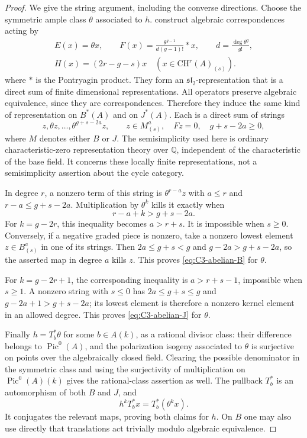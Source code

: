 \begin{proof}
We give the string argument, including the converse directions.
Choose the symmetric ample class $\theta$ associated to $h$.
\citet[Theorem 4.2 and Proposition 5.2, pp.~260--261]{rootBeauville2010}
construct algebraic correspondences acting by
\[
 \begin{gathered}
 E(x)=\theta x,\qquad
 F(x)=\frac{\theta^{g-1}}{d(g-1)!}*x,\qquad
 d=\frac{\deg\theta^g}{g!},\\
 H(x)=(2r-g-s)x\quad(x\in\mathrm{CH}^r(A)_{(s)}).
 \end{gathered}
\]
where $*$ is the Pontryagin product. They form an
$\mathfrak{sl}_2$-representation that is a direct sum of finite
dimensional representations. All operators preserve algebraic
equivalence, since they are correspondences. Therefore they induce
the same kind of representation on $B^*(A)$ and on $J^*(A)$.
Each is a direct sum of strings
\[
        z,\theta z,\ldots,\theta^{g+s-2a}z,
 \qquad z\in M^a_{(s)},\quad Fz=0,\quad g+s-2a\ge0,
\]
where $M$ denotes either $B$ or $J$. The semisimplicity used here
is ordinary characteristic-zero representation theory over
$\mathbb Q$, independent of the characteristic of the base field.
It concerns these locally finite representations, not a
semisimplicity assertion about the cycle category.

In degree $r$, a nonzero term of this string is
$\theta^{r-a}z$ with $a\le r$ and $r-a\le g+s-2a$.
Multiplication by $\theta^k$ kills it exactly when
\[
                         r-a+k>g+s-2a.
\]
For $k=g-2r$, this inequality becomes $a>r+s$.
It is impossible when $s\ge0$. Conversely, if a negative
graded piece is nonzero, take a nonzero lowest element
$z\in B^a_{(s)}$ in one of its strings. Then
$2a\le g+s<g$ and $g-2a>g+s-2a$, so the asserted
map in degree $a$ kills $z$. This proves
\eqref{eq:C3-abelian-B} for $\theta$.

For $k=g-2r+1$, the corresponding inequality is
$a>r+s-1$, impossible when $s\ge1$. A nonzero string
with $s\le0$ has $2a\le g+s\le g$ and
$g-2a+1>g+s-2a$; its lowest element is therefore a
nonzero kernel element in an allowed degree. This proves
\eqref{eq:C3-abelian-J} for $\theta$.

Finally $h=T_b^*\theta$ for some $b\in A(k)$, as a rational
divisor class: their difference belongs to $\operatorname{Pic}^0(A)$,
and the polarization isogeny associated to $\theta$ is surjective
on points over the algebraically closed field. Clearing the
possible denominator in the symmetric class and using the
surjectivity of multiplication on $\operatorname{Pic}^0(A)(k)$
gives the rational-class assertion as well. The pullback
$T_b^*$ is an automorphism of both $B$ and $J$, and
\[
             h^k T_b^*x=T_b^*(\theta^k x).
\]
It conjugates the relevant maps, proving both claims for $h$.
On $B$ one may also use directly that translations act trivially
modulo algebraic equivalence.
\end{proof}


